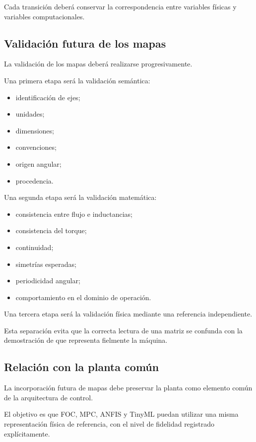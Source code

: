 Cada transición deberá conservar la correspondencia entre variables físicas y variables computacionales.

\subsection{Validación futura de los mapas}

La validación de los mapas deberá realizarse progresivamente.

Una primera etapa será la validación semántica:

\begin{itemize}
\item identificación de ejes;
\item unidades;
\item dimensiones;
\item convenciones;
\item origen angular;
\item procedencia.
\end{itemize}

Una segunda etapa será la validación matemática:

\begin{itemize}
\item consistencia entre flujo e inductancias;
\item consistencia del torque;
\item continuidad;
\item simetrías esperadas;
\item periodicidad angular;
\item comportamiento en el dominio de operación.
\end{itemize}

Una tercera etapa será la validación física mediante una referencia independiente.

Esta separación evita que la correcta lectura de una matriz se confunda con la demostración de que representa fielmente la máquina.

\subsection{Relación con la planta común}

La incorporación futura de mapas debe preservar la planta como elemento común de la arquitectura de control.

El objetivo es que FOC, MPC, ANFIS y TinyML puedan utilizar una misma representación física de referencia, con el nivel de fidelidad registrado explícitamente.

